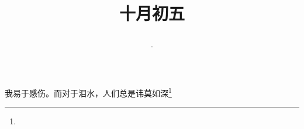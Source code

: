 \title{\date[d=5,m=11,y=2024][year:cn-y,年,month:cn,day:cn,日,·,weekday]·十月初五 }
我易于感伤。而对于泪水，人们总是讳莫如深\footnote{ }

